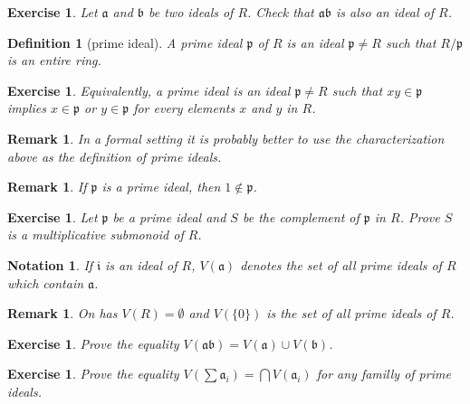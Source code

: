 \documentclass[12pt]{report}
\newtheorem{definition}[proposition]{Definition}
\newtheorem{remark}[proposition]{Remark}
\newtheorem{ex}[proposition]{Exercise}
\newtheorem{notation}{Notation}
\begin{document}
\begin{ex}
	Let $\mathfrak{a}$ and $\mathfrak{b}$ be two ideals of $R$. Check that $\mathfrak{a} \mathfrak{b}$ is also an ideal of $R$.
\end{ex}
		
\begin{definition}[prime ideal]
	A prime ideal $\mathfrak{p}$ of $R$ is an ideal $\mathfrak{p} \neq R$ such that $R/\mathfrak{p}$ is an entire ring. 	
\end{definition}

\begin{ex}
	Equivalently, a prime ideal is an ideal $\mathfrak{p} \neq R$ such that $x y \in \mathfrak{p}$ implies $x \in \mathfrak{p}$ or $y \in \mathfrak{p}$ for every elements $x$ and $y$ in $R$.
\end{ex}

\begin{remark}
	In a formal setting it is probably better to use the characterization above as the definition of prime ideals.
\end{remark}

\begin{remark}
	If $\mathfrak{p}$ is a prime ideal, then $1 \notin \mathfrak{p}$.
\end{remark}

\begin{ex}
	Let $\mathfrak{p}$ be a prime ideal and $S$ be the complement of $\mathfrak{p}$ in $R$. Prove $S$ is a multiplicative submonoid of $R$. 
\end{ex}		

\begin{notation}
	If $\mathfrak{i}$ is an ideal of $R$, $V(\mathfrak{a})$ denotes the set of all prime ideals of $R$ which contain $\mathfrak{a}$. 
\end{notation}

\begin{remark}
	On has $V(R) = \emptyset$ and $V(\lbrace 0 \rbrace)$ is the set of all prime ideals of $R$.
\end{remark}	

\begin{ex}
Prove the equality $V(\mathfrak{a} \mathfrak{b}) = V(\mathfrak{a}) \cup V(\mathfrak{b})$.	
\end{ex}

\begin{ex}
	Prove the equality $V(\sum \mathfrak{a}_i) = \bigcap V(\mathfrak{a}_i)$ for any familly of prime ideals.
\end{ex}
\end{document}
